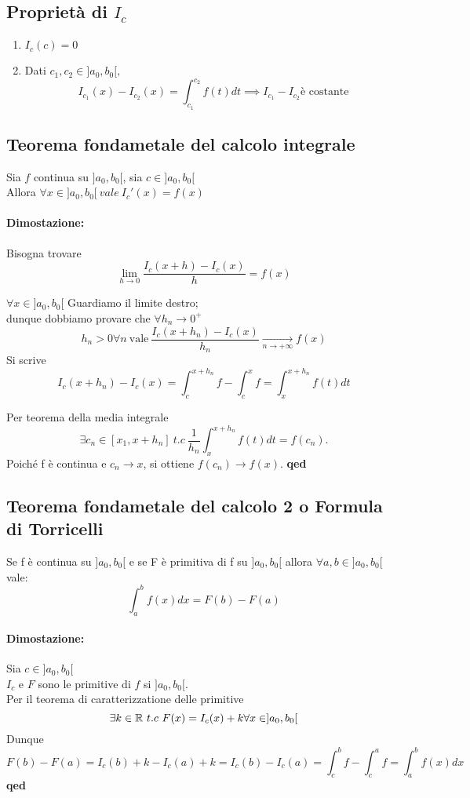 \documentclass[a4paper]{article}
\begin{document}
\subsection{Proprietà di $I_c$}
\begin{enumerate}
		\item $ I_c(c)=0 $
		\item Dati $ c_1,c_2 \in ]a_0,b_0[,$
			$$
			I_{c_1}(x) - I_{c_2}(x) = \int_{c_1}^{c_2} f(t) dt \implies I_{c_1} - I_{c_2} \text{è costante}
			$$
\end{enumerate}

\subsection{Teorema fondametale del calcolo integrale}
Sia $f$ continua su $]a_0,b_0[$, sia $c \in ]a_0,b_0[$ \\ 
Allora $\forall x \in ]a_0,b_0[\ vale\ I_c' (x) = f(x) $

\paragraph{Dimostazione: } Bisogna trovare 
$$
\lim_{h \to 0} \frac{ I_c(x+h) - I_c(x)}{h} = f(x)
$$

$ \forall x \in ]a_0,b_0[$ Guardiamo il limite destro; \\ dunque dobbiamo provare che $ \forall h_n \to 0^+ $ \\
$$ h_n > 0 \forall n\ \text{vale}\ \frac{I_c(x+h_n) - I_c(x)}{h_n} \xrightarrow[n \to + \infty]{} f(x) $$
Si scrive
$$
	I_c(x+h_n)-I_c(x) = \int_c^{x+h_n} f - \int_c^x f = \int_x^{x+h_n}\! f(t)dt
$$

Per teorema della media integrale $$ \exists c_n \in [x_1,x+h_n]\ t.c\ \frac{1}{h_n} \int_x^{x+h_n} f(t)dt = f(c_n).$$
Poiché f è continua e $ c_n \to x $, si ottiene $ f(c_n) \to f(x) $. \textbf{qed}

\subsection{Teorema fondametale del calcolo 2 o Formula di Torricelli}

Se f è continua su $]a_0,b_0[$ e se F è primitiva di f su $]a_0,b_0[$ allora $\forall a,b \in ]a_0,b_0[$ vale:
$$
\int_a^b f(x)dx = F(b)-F(a)
$$
\paragraph{Dimostazione:} Sia $c \in ]a_0,b_0[$ \\
$I_c$ e $F$ sono le primitive di $f$ si $]a_0,b_0[$. \\
Per il teorema di caratterizzatione delle primitive $$\exists k \in \mathbb{R} \ t.c\ F(x)=I_c(x)+k \forall x \in ]a_0,b_0[ $$
Dunque
$$
	F(b)-F(a)=I_c(b)+k-I_c(a)+k=I_c(b) -I_c(a) = \int_c^b f - \int_c^a f= \int_a^b f(x)dx
$$
\textbf{qed}
\end{document}
